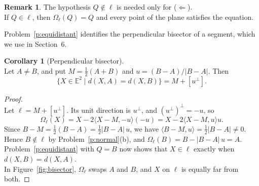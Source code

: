 \documentclass[11pt,a4paper]{article}
\theoremstyle{boxed}
\theoremstyle{definition}
\newtheorem{corollary}{Corollary}
\newtheorem*{remark}{Remark}
\newenvironment{plate}{\par\medskip\noindent\begin{minipage}{\linewidth}\centering}{\end{minipage}\par\medskip}
\newcommand{\E}{\mathbb{E}^2}
\newcommand{\ip}[2]{\langle #1, #2 \rangle}
\newcommand{\abs}[1]{\lvert #1 \rvert}
\newcommand{\eqtick}[2]{\draw ($(#1)!0.5!(#2)!1.2mm!90:(#2)$) -- ($(#1)!0.5!(#2)!1.2mm!-90:(#2)$);}
\begin{document}
\begin{remark}
The hypothesis $Q\notin\ell$ is needed only for ($\Leftarrow$).\\
If $Q\in\ell$, then $\Omega_\ell(Q)=Q$ and every point of the plane satisfies the equation.
\end{remark}

\begin{plate}
\label{fig:equidistant}
\end{plate}

\noindent Problem~\ref{p:equidistant} identifies the perpendicular bisector of a segment, which we use in Section~6.

\begin{corollary}[Perpendicular bisector]\label{c:bisector}
\leavevmode\\
Let $A\neq B$, and put $M=\tfrac12(A+B)$ and $u=(B-A)/\abs{B-A}$. Then
\[
\{X\in\E \mid d(X,A)=d(X,B)\}=M+[u^\perp].
\]
\end{corollary}

\begin{proof}
\leavevmode\\
Let $\ell=M+[u^\perp]$. Its unit direction is $u^\perp$, and $(u^\perp)^\perp=-u$, so
\[
\Omega_\ell(X)=X-2\ip{X-M}{-u}(-u)=X-2\ip{X-M}{u}u.
\]
Since $B-M=\tfrac12(B-A)=\tfrac12\abs{B-A}\,u$, we have $\ip{B-M}{u}=\tfrac12\abs{B-A}\neq0$.\\
Hence $B\notin\ell$ by Problem~\ref{p:normal}(b), and $\Omega_\ell(B)=B-\abs{B-A}\,u=A$.\\
Problem~\ref{p:equidistant} with $Q=B$ now shows that $X\in\ell$ exactly when $d(X,B)=d(X,A)$.\\
In Figure~\ref{fig:bisector}, $\Omega_\ell$ swaps $A$ and $B$, and $X$ on $\ell$ is equally far from both.
\end{proof}
\end{document}
